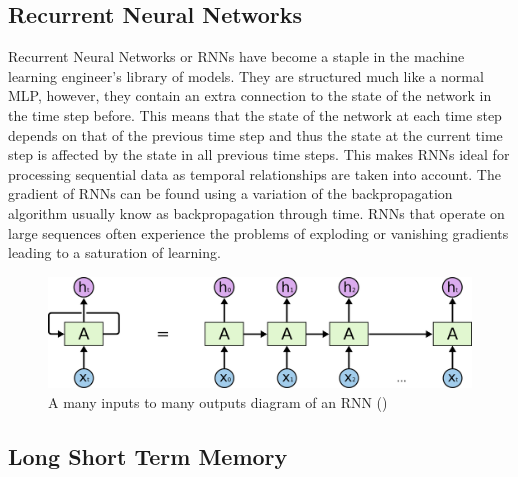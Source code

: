 \subsection{Recurrent Neural Networks}

Recurrent Neural Networks or RNNs have become a staple in the machine learning engineer's library of models. 
They are structured much like a normal MLP, however, they contain an extra connection to the state of the network in the time step before.
This means that the state of the network at each time step depends on that of the previous time step and thus the state at the current time step is affected by the state in all previous time steps.
This makes RNNs ideal for processing sequential data as temporal relationships are taken into account.
The gradient of RNNs can be found using a variation of the backpropagation algorithm usually know as backpropagation through time.
RNNs that operate on large sequences often experience the problems of exploding or vanishing gradients leading to a saturation of learning.

\begin{figure}
    \centering
    \includegraphics[width=0.8\columnwidth]{Figures/RNN}
    \decoRule
    \caption[An RNN]{A many inputs to many outputs diagram of an RNN (\cite{oinkina})}
    \label{fig:RNN}
\end{figure}

\subsection{Long Short Term Memory}

